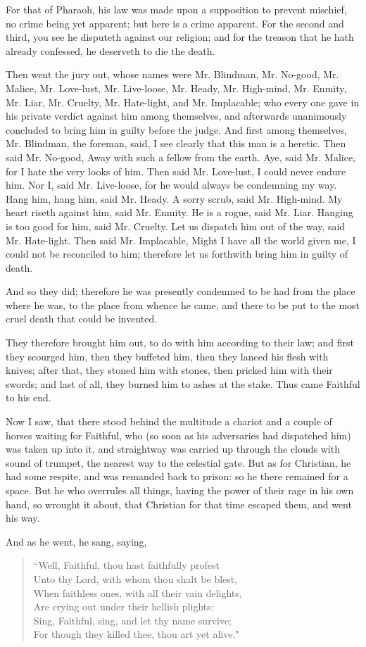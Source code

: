 For that of Pharaoh, his law was made upon a supposition to prevent mischief, no crime being yet apparent; but here is a crime apparent. For the second and third, you see he disputeth against our religion; and for the treason that he hath already confessed, he deserveth to die the death.

Then went the jury out, whose names were Mr. Blindman, Mr. No-good, Mr. Malice, Mr. Love-lust, Mr. Live-loose, Mr. Heady, Mr. High-mind, Mr. Enmity, Mr. Liar, Mr. Cruelty, Mr. Hate-light, and Mr. Implacable; who every one gave in his private verdict against him among themselves, and afterwards unanimously concluded to bring him in guilty before the judge. And first among themselves, Mr. Blindman, the foreman, said, I see clearly that this man is a heretic. Then said Mr. No-good, Away with such a fellow from the earth. Aye, said Mr. Malice, for I hate the very looks of him. Then said Mr. Love-lust, I could never endure him. Nor I, said Mr. Live-loose, for he would always be condemning my way. Hang him, hang him, said Mr. Heady. A sorry scrub, said Mr. High-mind. My heart riseth against him, said Mr. Enmity. He is a rogue, said Mr. Liar. Hanging is too good for him, said Mr. Cruelty. Let us dispatch him out of the way, said Mr. Hate-light. Then said Mr. Implacable, Might I have all the world given me, I could not be reconciled to him; therefore let us forthwith bring him in guilty of death.

And so they did; therefore he was presently condemned to be had from the place where he was, to the place from whence he came, and there to be put to the most cruel death that could be invented.

They therefore brought him out, to do with him according to their law; and first they scourged him, then they buffeted him, then they lanced his flesh with knives; after that, they stoned him with stones, then pricked him with their swords; and last of all, they burned him to ashes at the stake. Thus came Faithful to his end.

Now I saw, that there stood behind the multitude a chariot and a couple of horses waiting for Faithful, who (so soon as his adversaries had dispatched him) was taken up into it, and straightway was carried up through the clouds with sound of trumpet, the nearest way to the celestial gate. But as for Christian, he had some respite, and was remanded back to prison: so he there remained for a space. But he who overrules all things, having the power of their rage in his own hand, so wrought it about, that Christian for that time escaped them, and went his way.

And as he went, he sang, saying,
\begin{verse}
``Well, Faithful, thou hast faithfully profest\\
Unto thy Lord, with whom thou shalt be blest,\\
When faithless ones, with all their vain delights,\\
Are crying out under their hellish plights:\\
Sing, Faithful, sing, and let thy name survive;\\
For though they killed thee, thou art yet alive."\\
\end{verse}
